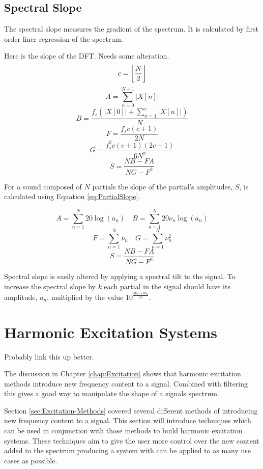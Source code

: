 	\subsection{Spectral Slope}
	\label{sec:FetureControl-Parameterisation-Flatness}
		The spectral slope measures the gradient of the spectrum. It is calculated by first order liner regression
		of the spectrum.

		\note
		{
			Here is the slope of the DFT. Needs some alteration.
			\[ c = \left\lfloor\frac{N}{2}\right\rfloor \]
			\[ A = \sum_{n = 0}^{N - 1} |X[n]| \]
			\todo
			{
				\[ B = \frac{f_{s} \left(|X[0]| + \sum_{n = 1}^{c} |X[n]| \right)}
					    {N} \]
			}
			\[ F = \frac{f_{s}c(c + 1)}
				    {2N} \]
			\[ G = \frac{f_{s}^{2}c(c + 1)(2c + 1)}
				    {6N^{2}} \]
			\begin{equation}
				S = \frac{NB - FA}
					 {NG - F^{2}}
				\label{eq:SpectralSlope}
			\end{equation}
		}

		For a sound composed of $N$ partials the slope of the partial's amplitudes, $S$, is calculated using
		Equation \ref{eq:PartialSlope}.
		
		\[ A = \sum_{n = 1}^{N} 20\log (a_{n}) \quad B = \sum_{n = 1}^{N} 20\nu_{n}\log (a_{n}) \]
		\[ F = \sum_{n = 1}^{N} \nu_{n} \quad G = \sum_{n = 1}^{N} \nu_{n}^{2} \]
		\begin{equation}
			S = \frac{NB - FA}
		                 {NG - F^{2}}
			\label{eq:PartialSlope}
		\end{equation}

		Spectral slope is easily altered by applying a spectral tilt to the signal. To increase the spectral slope
		by $k$ each partial in the signal should have its amplitude, $a_{n}$, multiplied by the
		value $10^{\frac{k\nu_{n} - ka_{1}}{20}}$.

\section{Harmonic Excitation Systems}
\label{sec:FeatureControl-Systems}
	\todo
	{
		Probably link this up better.

		The discussion in Chapter \ref{chap:Excitation} shows that harmonic excitation methods introduce new
		frequency content to a signal. Combined with filtering this gives a good way to manipulate the shape of a
		signals spectrum.

	}

	Section \ref{sec:Excitation-Methods} covered several different methods of introducing new frequency content to a
	signal. This section will introduce techniques which can be used in conjunction with those methods to build
	harmonic excitation systems. These techniques aim to give the user more control over the new content added to the
	spectrum producing a system with can be applied to as many use cases as possible.

